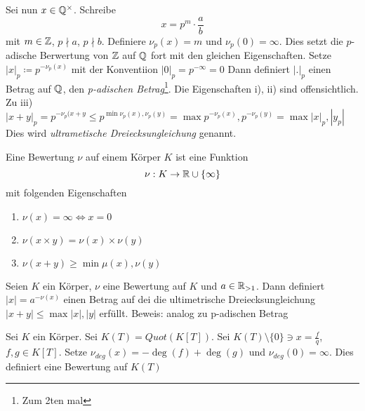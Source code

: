 \documentclass[../main.tex]{subfiles}
\begin{document}
Sei nun $x\in \mathbb{Q}^\times$. Schreibe
$$x=p^m\cdot\frac{a}{b}$$ mit $m\in \mathbb{Z}$, $p\nmid a$, $p\nmid b$.
Definiere $\nu_p(x) = m$ und $\nu_p(0) = \infty$. Dies setzt die $p$-adische Berwertung von $\mathbb{Z}$ auf $\mathbb{Q}$ fort mit den gleichen Eigenschaften.
Setze $|x|_p \coloneqq p^{-\nu_p(x)}$ mit der Konventiion $|0|_p = p^{-\infty} = 0$
Dann definiert $|.|_p$ einen Betrag auf $\mathbb{Q}$, den \emph{p-adischen Betrag}\footnote{Zum 2ten mal}. Die Eigenschaften i), ii) sind offensichtlich.
Zu iii) $|x+y|_p = p^{-\nu_p(x+y}\leq p^{\min{\nu_p(x),\nu_p(y)}} = \max{p^{-\nu_p(x)}, p^{-\nu_p(y)}} = \max{|x|_p,|y_p|}$ %
Dies wird \emph{ultrametische Dreiecksungleichung} genannt.
\begin{definition}
    Eine Bewertung $\nu$ auf einem Körper $K$ ist eine Funktion $$\nu:K\rightarrow \mathbb{R}\cup \{\infty\}$$
    mit folgenden Eigenschaften
    \begin{enumerate}[label=\roman*)]
        \item $\nu(x) = \infty \Leftrightarrow x= 0$
        \item $\nu(x\times y) = \nu(x)\times\nu(y)$
        \item $\nu(x+y) \geq \min{\mu(x), \nu(y)}$ 
    \end{enumerate}
\end{definition}
\begin{lemma}
    Seien $K$ ein Körper, $\nu$ eine Bewertung auf $K$ und $a\in \mathbb{R}_{>1}$. Dann definiert $|x| = a^{-\nu(x)}$ einen Betrag auf dei die ultimetrische Dreiecksungleichung $|x+y| \leq \max{|x|,|y|}$ erfüllt.
    Beweis: analog zu p-adischen Betrag
\end{lemma}
\begin{example}
    Sei $K$ ein Körper. Sei $K(T) = Quot(K[T])$.
    Sei $K(T)\setminus\{0\}\ni x = \frac{f}{q}$, $f,g\in K[T]$.
    Setze $\nu_{deg}(x) = -\deg(f)+\deg(g)$ und $\nu_{deg}(0) = \infty$.
    Dies definiert eine Bewertung auf $K(T)$
\end{example}
\end{document}
